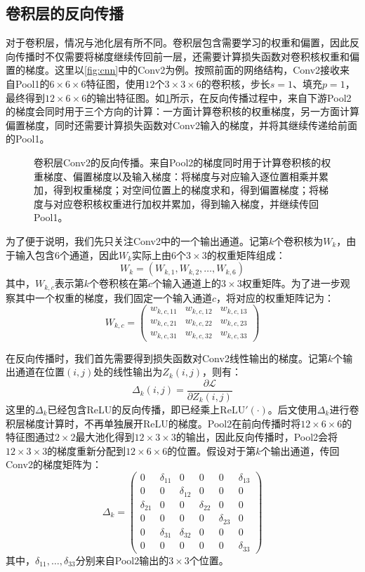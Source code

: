 \subsection{卷积层的反向传播}

对于卷积层，情况与池化层有所不同。卷积层包含需要学习的权重和偏置，因此反向传播时不仅需要将梯度继续传回前一层，还需要计算损失函数对卷积核权重和偏置的梯度。这里以\cref{fig:cnn}中的Conv2为例。按照前面的网络结构，Conv2接收来自Pool1的$6\times6\times6$特征图，使用$12$个$3\times3\times6$的卷积核，步长$s=1$、填充$p=1$，最终得到$12\times6\times6$的输出特征图。如\cref{fig:bp_convolution}所示，在反向传播过程中，来自下游Pool2的梯度会同时用于三个方向的计算：一方面计算卷积核的权重梯度，另一方面计算偏置梯度，同时还需要计算损失函数对Conv2输入的梯度，并将其继续传递给前面的Pool1。

\begin{figure}[H]
    \caption{卷积层Conv2的反向传播。来自Pool2的梯度同时用于计算卷积核的权重梯度、偏置梯度以及输入梯度：将梯度与对应输入逐位置相乘并累加，得到权重梯度；对空间位置上的梯度求和，得到偏置梯度；将梯度与对应卷积核权重进行加权并累加，得到输入梯度，并继续传回Pool1。}
    \label{fig:bp_convolution}
\end{figure}

为了便于说明，我们先只关注Conv2中的一个输出通道。记第$k$个卷积核为$W_k$，由于输入包含$6$个通道，因此$W_k$实际上由$6$个$3\times3$的权重矩阵组成：
$$
W_k=\left(W_{k,1},W_{k,2},\ldots,W_{k,6}\right)
$$
其中，$W_{k,c}$表示第$k$个卷积核在第$c$个输入通道上的$3\times3$权重矩阵。为了进一步观察其中一个权重的梯度，我们固定一个输入通道$c$，将对应的权重矩阵记为：
$$
W_{k,c}=\begin{pmatrix}
w_{k,c,11}&w_{k,c,12}&w_{k,c,13}\\
w_{k,c,21}&w_{k,c,22}&w_{k,c,23}\\
w_{k,c,31}&w_{k,c,32}&w_{k,c,33}
\end{pmatrix}
$$

在反向传播时，我们首先需要得到损失函数对Conv2线性输出的梯度。记第$k$个输出通道在位置$(i,j)$处的线性输出为$Z_k(i,j)$，则有：
$$
\Delta_k(i,j)=\frac{\partial\mathcal{L}}{\partial Z_k(i,j)}
$$
这里的$\Delta_k$已经包含ReLU的反向传播，即已经乘上$\mathrm{ReLU}'(\cdot)$。后文使用$\Delta_k$进行卷积层梯度计算时，不再单独展开ReLU的梯度。Pool2在前向传播时将$12\times6\times6$的特征图通过$2\times2$最大池化得到$12\times3\times3$的输出，因此反向传播时，Pool2会将$12\times3\times3$的梯度重新分配到$12\times6\times6$的位置。假设对于第$k$个输出通道，传回Conv2的梯度矩阵为：
$$
\Delta_k=\left(\begin{array}{cc|cc|cc}
0&\delta_{11}&0&0&0&\delta_{13}\\
0&0&\delta_{12}&0&0&0\\ \hline
\delta_{21}&0&0&\delta_{22}&0&0\\
0&0&0&0&\delta_{23}&0\\ \hline
0&\delta_{31}&\delta_{32}&0&0&0\\
0&0&0&0&0&\delta_{33}
\end{array}
\right)
$$
其中，$\delta_{11},\ldots,\delta_{33}$分别来自Pool2输出的$3\times3$个位置。

